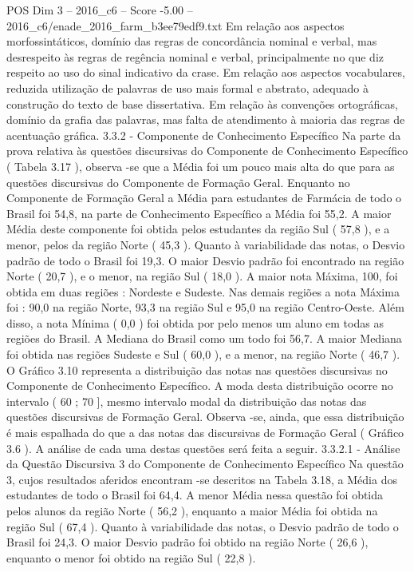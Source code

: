 \begin{textsample}{POS Dim 3 – 2016\_c6 – Score -5.00 – 2016\_c6/enade\_2016\_farm\_b3ee79edf9.txt}
Em relação aos aspectos morfossintáticos, domínio das regras de concordância nominal e verbal, mas desrespeito às regras de regência nominal e verbal, principalmente no que diz respeito ao uso do sinal indicativo da crase.
Em relação aos aspectos vocabulares, reduzida utilização de palavras de uso mais formal e abstrato, adequado à construção do texto de base dissertativa.
Em relação às convenções ortográficas, domínio da grafia das palavras, mas falta de atendimento à maioria das regras de acentuação gráfica. 3.3.2 - Componente de Conhecimento Específico Na parte da prova relativa às questões discursivas do Componente de Conhecimento Específico ( Tabela 3.17 ), observa -se que a Média foi um pouco mais alta do que para as questões discursivas do Componente de Formação Geral.
Enquanto no Componente de Formação Geral a Média para estudantes de Farmácia de todo o Brasil foi 54,8, na parte de Conhecimento Específico a Média foi 55,2.
A maior Média deste componente foi obtida pelos estudantes da região Sul ( 57,8 ), e a menor, pelos da região Norte ( 45,3 ).
Quanto à variabilidade das notas, o Desvio padrão de todo o Brasil foi 19,3.
O maior Desvio padrão foi encontrado na região Norte ( 20,7 ), e o menor, na região Sul ( 18,0 ).
A maior nota Máxima, 100, foi obtida em duas regiões : Nordeste e Sudeste.
Nas demais regiões a nota Máxima foi : 90,0 na região Norte, 93,3 na região Sul e 95,0 na região Centro-Oeste.
Além disso, a nota Mínima ( 0,0 ) foi obtida por pelo menos um aluno em todas as regiões do Brasil.
A Mediana do Brasil como um todo foi 56,7.
A maior Mediana foi obtida nas regiões Sudeste e Sul ( 60,0 ), e a menor, na região Norte ( 46,7 ).
O Gráfico 3.10 representa a distribuição das notas nas questões discursivas no Componente de Conhecimento Específico.
A moda desta distribuição ocorre no intervalo ( 60 ; 70 ], mesmo intervalo modal da distribuição das notas das questões discursivas de Formação Geral.
Observa -se, ainda, que essa distribuição é mais espalhada do que a das notas das discursivas de Formação Geral ( Gráfico 3.6 ).
A análise de cada uma destas questões será feita a seguir. 3.3.2.1 - Análise da Questão Discursiva 3 do Componente de Conhecimento Específico Na questão 3, cujos resultados aferidos encontram -se descritos na Tabela 3.18, a Média dos estudantes de todo o Brasil foi 64,4.
A menor Média nessa questão foi obtida pelos alunos da região Norte ( 56,2 ), enquanto a maior Média foi obtida na região Sul ( 67,4 ).
Quanto à variabilidade das notas, o Desvio padrão de todo o Brasil foi 24,3.
O maior Desvio padrão foi obtido na região Norte ( 26,6 ), enquanto o menor foi obtido na região Sul ( 22,8 ).

\end{textsample}
